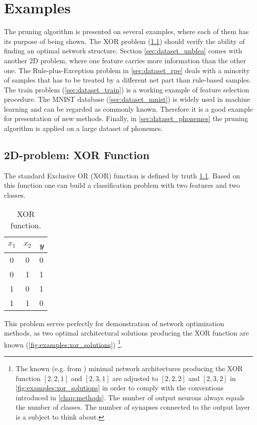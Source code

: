 \chapter{Examples} \label{chap:examples}
The pruning algorithm is presented on several examples, where each of them has its purpose of being shown. The XOR problem (\cref{sec:dataset_xor}) should verify the ability of finding an optimal network structure. Section \ref{sec:dataset_unbfea} comes with another 2D problem, where one feature carries more information than the other one. The Rule-plus-Exception problem in \cref{sec:dataset_rpe} deals with a minority of samples that has to be treated by a different net part than rule-based samples. The train problem (\cref{sec:dataset_train}) is a working example of feature selection procedure. The MNIST database (\cref{sec:dataset_mnist}) is widely used in machine learning and can be regarded as commonly known. Therefore it is a good example for presentation of new methods. Finally, in \cref{sec:dataset_phonemes} the pruning algorithm is applied on a large dataset of phonemes.

\section{2D-problem: XOR Function} \label{sec:dataset_xor}
The standard Exclusive OR (XOR) function is defined by truth \cref{tab:examples:xor_function}. Based on this function one can build a classification problem with two features and two classes.

\begin{table}[H]
\centering
\begin{tabular}{|c|c||c|}
\hline
\textit{$ x_1 $} & \textit{$ x_2 $} & \textit{y} \\ \hline \hline
0                & 0                & 0          \\ \hline
0                & 1                & 1          \\ \hline
1                & 0                & 1          \\ \hline
1                & 1                & 0          \\ \hline
\end{tabular}
\caption{XOR function.}
\label{tab:examples:xor_function}
\end{table}

This problem serves perfectly for demonstration of network optimization methods, as two optimal architectural solutions producing the XOR function are known (\cref{fig:examples:xor_solutions}) \footnote{The known (e.g. from \citep{online:xor_solution}) minimal network architectures producing the XOR function $ [2, 2, 1] $ and $ [2, 3, 1] $ are adjusted to $ [2, 2, 2] $ and $ [2, 3, 2] $ in \cref{fig:examples:xor_solutions} in order to comply with the conventions introduced in \cref{chap:methods}. The number of output neurons always equals the number of classes. The number of synapses connected to the output layer is a subject to think about.}. 

